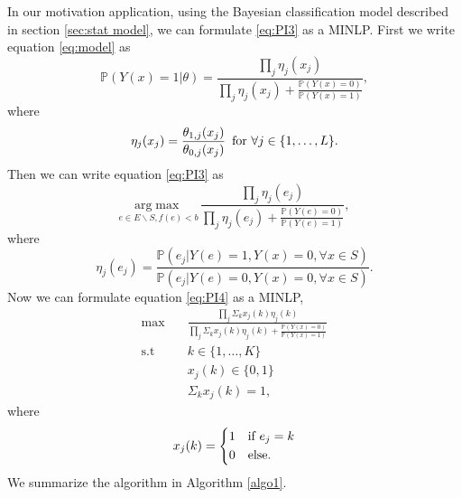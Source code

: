 \documentclass[opre,nonblindrev]{informs3} %
\newcommand{\Prob}{\mathbb{P}}
\begin{document}
In our motivation application, using the Bayesian classification model described in section \ref{sec:stat model}, we can formulate \eqref{eq:PI3} as a MINLP. First we write equation \eqref{eq:model} as
\begin{equation} \label{model1}
\Prob\left(Y(x) = 1 | \theta\right) =
\frac{\prod_j \eta_j(x_j)}{\prod_j \eta_j(x_j) + \frac{\Prob(Y(x)=0)}{\Prob(Y(x)=1)}},
\end{equation}
where
\begin{equation*}
\eta_j(x_j) = \frac{\theta_{1,j}(x_j)}{\theta_{0,j}(x_j)} \text{\,\,\,for $\forall j \in \{1,\ldots,L\}$}. 
\end{equation*}
Then we can write equation \eqref{eq:PI3} as
\begin{equation} \label{eq:PI4}
\underset{e \in E \backslash S, f(e)<b}{\mathrm{arg}\max} \, \frac{\prod_j \eta_j(e_j)}{\prod_j \eta_j(e_j) + \frac{\Prob(Y(e)=0)}{\Prob(Y(e)=1)}},
\end{equation}
where 
\begin{equation*}
\eta_j(e_j)=\frac{\Prob(e_j|Y(e)=1,Y(x)=0, \forall x \in S)}{\Prob(e_j|Y(e)=0,Y(x)=0, \forall x \in S)}.
\end{equation*}
Now we can formulate equation \eqref{eq:PI4} as a MINLP,
\begin{equation} \label{eq:PI5}
\begin{split}
\max \quad &\frac{\prod_j \Sigma_k x_j(k) \eta_j(k)}{\prod_j \Sigma_k x_j(k) \eta_j(k) + \frac{\Prob(Y(x)=0)}{\Prob(Y(x)=1)}} \\
\text{s.t} \quad &k \in \{1,\ldots,K\} \\
&x_j(k) \in \{0,1\}\\
&\Sigma_k x_j(k)=1,
\end{split}
\end{equation}
where
\begin{equation*}
x_j(k)=\begin{dcases}
        1 & \text{if $e_j=k$}\\
        0 & \text{else}.
\end{dcases}
\end{equation*}
We summarize the algorithm in Algorithm \ref{algo1}.
\end{document}
